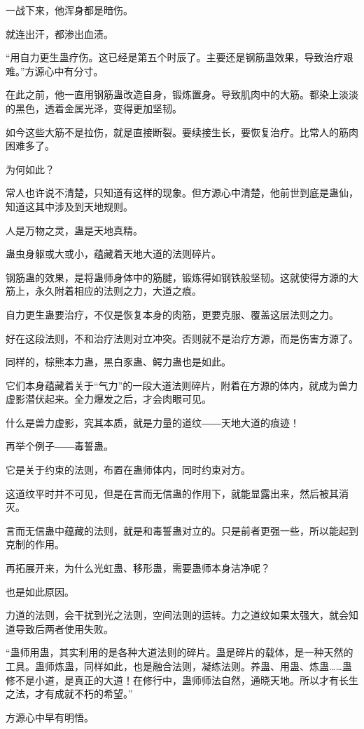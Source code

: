 \begin{this_body}
一战下来，他浑身都是暗伤。

就连出汗，都渗出血渍。

“用自力更生蛊疗伤。这已经是第五个时辰了。主要还是钢筋蛊效果，导致治疗艰难。”方源心中有分寸。

在此之前，他一直用钢筋蛊改造自身，锻炼置身。导致肌肉中的大筋。都染上淡淡的黑色，透着金属光泽，变得更加坚韧。

如今这些大筋不是拉伤，就是直接断裂。要续接生长，要恢复治疗。比常人的筋肉困难多了。

为何如此？

常人也许说不清楚，只知道有这样的现象。但方源心中清楚，他前世到底是蛊仙，知道这其中涉及到天地规则。

人是万物之灵，蛊是天地真精。

蛊虫身躯或大或小，蕴藏着天地大道的法则碎片。

钢筋蛊的效果，是将蛊师身体中的筋腱，锻炼得如钢铁般坚韧。这就使得方源的大筋上，永久附着相应的法则之力，大道之痕。

自力更生蛊要治疗，不仅是恢复本身的肉筋，更要克服、覆盖这层法则之力。

好在这段法则，不和治疗法则对立冲突。否则就不是治疗方源，而是伤害方源了。

同样的，棕熊本力蛊，黑白豕蛊、鳄力蛊也是如此。

它们本身蕴藏着关于“气力”的一段大道法则碎片，附着在方源的体内，就成为兽力虚影潜伏起来。全力爆发之后，才会肉眼可见。

什么是兽力虚影，究其本质，就是力量的道纹――天地大道的痕迹！

再举个例子――毒誓蛊。

它是关于约束的法则，布置在蛊师体内，同时约束对方。

这道纹平时并不可见，但是在言而无信蛊的作用下，就能显露出来，然后被其消灭。

言而无信蛊中蕴藏的法则，就是和毒誓蛊对立的。只是前者更强一些，所以能起到克制的作用。

再拓展开来，为什么光虹蛊、移形蛊，需要蛊师本身洁净呢？

也是如此原因。

力道的法则，会干扰到光之法则，空间法则的运转。力之道纹如果太强大，就会知道导致后两者使用失败。

“蛊师用蛊，其实利用的是各种大道法则的碎片。蛊是碎片的载体，是一种天然的工具。蛊师炼蛊，同样如此，也是融合法则，凝练法则。养蛊、用蛊、炼蛊……蛊修不是小道，是真正的大道！在修行中，蛊师师法自然，通晓天地。所以才有长生之法，才有成就不朽的希望。”

方源心中早有明悟。


\end{this_body}

